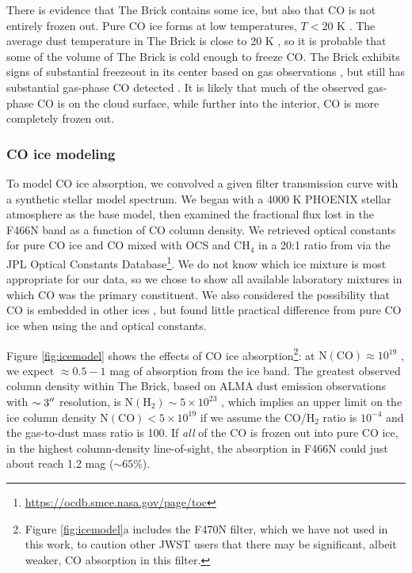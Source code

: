 \documentclass[times,astrosymb,twocolumn]{aastex631}
\def\rr#1{#1}
\begin{document}
There is evidence that The Brick contains some ice, but \rr{also} that CO is not entirely frozen out.
Pure CO ice forms at low temperatures, $T<20$ K \citep{Hudgins1993}.
The average dust temperature in The Brick is close to 20 K \citep{Tang2021}, so it is probable that some of the volume of The Brick is cold enough to freeze CO.
The Brick exhibits signs of substantial freezeout in its center based on gas observations \citep{Rathborne2014b}, but still has substantial gas-phase CO detected \citep{Ginsburg2016,Rigby2016,Eden2020}.
It is likely that much of the observed gas-phase CO is on the cloud surface, while further into the interior, CO is more completely frozen out.

\subsubsection{CO ice modeling}

To model CO ice absorption, we convolve\rr{d} \rr{a given} filter transmission curve with a synthetic \rr{stellar} model spectrum.
We \rr{began} with a 4000 K PHOENIX stellar atmosphere \citep{Husser2013} as the base model, then examine\rr{d} the fractional flux lost in the F466N band as a function of CO column density.
We retrieve\rr{d} optical constants for pure CO ice and CO mixed with OCS and CH$_4$ in a 20:1 ratio from  \citet{Hudgins1993} via the JPL Optical Constants Database\footnote{\url{https://ocdb.smce.nasa.gov/page/toc}}.
\rr{We do not know which ice mixture is most appropriate for our data, so we chose to show all available laboratory mixtures in which CO was the primary constituent.}
We also considered the possibility that CO is embedded in other ices \citep[e.g., \water and \methanol][]{Pontoppidan2003,Boogert2008}, but found little practical difference from pure CO ice when using the \citet{Hudgins1993} and \citet{Rocha2016} optical constants.

Figure \ref{fig:icemodel} shows the effects of \rr{CO} ice absorption\footnote{Figure \ref{fig:icemodel}a includes the F470N filter, which we have not used in this work, to caution other JWST users that there may be significant, albeit weaker, CO absorption in this filter.}: at $\mathrm{N(CO)}\approx10^{19}$ \persc, we expect $\approx0.5-1$ mag of absorption from the ice band.
The \rr{greatest} observed column density within The Brick, based on ALMA dust emission observations with $\sim3\mbox{$^{\prime\prime}$}$ resolution, is $\mathrm{N}(\mathrm{H}_2)\sim5\times10^{23}$ \persc \citep{Rathborne2014a}, which implies an upper limit on the ice column density $\mathrm{N(CO)}<5\times10^{19}$ \persc if we assume the CO/H$_2$ ratio is $10^{-4}$ and \rr{the} gas-to-dust mass ratio \rr{is} 100.
If \emph{all} of the CO is frozen out into pure CO ice, in the highest column-density line-of-sight, the absorption \rr{in F466N} could just about reach 1.2 mag ($\sim65$\%).
\end{document}

